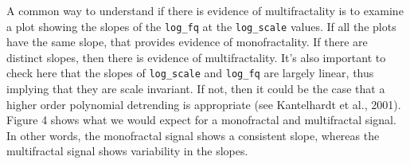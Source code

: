 \documentclass[
  man]{apa6}
\newenvironment{Shaded}{\begin{snugshade}}{\end{snugshade}}
\newcommand{\AttributeTok}[1]{\textcolor[rgb]{0.77,0.63,0.00}{#1}}
\newcommand{\DecValTok}[1]{\textcolor[rgb]{0.00,0.00,0.81}{#1}}
\newcommand{\FloatTok}[1]{\textcolor[rgb]{0.00,0.00,0.81}{#1}}
\newcommand{\FunctionTok}[1]{\textcolor[rgb]{0.00,0.00,0.00}{#1}}
\newcommand{\NormalTok}[1]{#1}
\newcommand{\OtherTok}[1]{\textcolor[rgb]{0.56,0.35,0.01}{#1}}
\newcommand{\SpecialCharTok}[1]{\textcolor[rgb]{0.00,0.00,0.00}{#1}}
\begin{document}
\begin{Shaded}
\end{Shaded}

A common way to understand if there is evidence of multifractality is to
examine a plot showing the slopes of the \texttt{log\_fq} at the \texttt{log\_scale}
values. If all the plots have the same slope, that provides evidence of
monofractality. If there are distinct slopes, then there is evidence of
multifractality. It's also important to check here that the slopes of
\texttt{log\_scale} and \texttt{log\_fq} are largely linear, thus implying that they are
scale invariant. If not, then it could be the case that a higher order
polynomial detrending is appropriate (see Kantelhardt et al., 2001).
Figure 4 shows what we would expect for a monofractal and multifractal
signal. In other words, the monofractal signal shows a consistent slope,
whereas the multifractal signal shows variability in the slopes.
\end{document}
